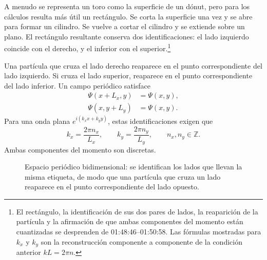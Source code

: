 A menudo se representa un toro como la superficie de un dónut, pero para los cálculos resulta más útil un rectángulo. Se corta la superficie una vez y se abre para formar un cilindro. Se vuelve a cortar el cilindro y se extiende sobre un plano. El rectángulo resultante conserva dos identificaciones: el lado izquierdo coincide con el derecho, y el inferior con el superior.\footnote{El rectángulo, la identificación de sus dos pares de lados, la reaparición de la partícula y la afirmación de que ambas componentes del momento están cuantizadas se desprenden de 01:48:46--01:50:58. Las fórmulas mostradas para \(k_x\) y \(k_y\) son la reconstrucción componente a componente de la condición anterior \(kL=2\pi n\).}

Una partícula que cruza el lado derecho reaparece en el punto correspondiente del lado izquierdo. Si cruza el lado superior, reaparece en el punto correspondiente del lado inferior. Un campo periódico satisface
\begin{align}
\Psi(x+L_x,y)&=\Psi(x,y),\\
\Psi(x,y+L_y)&=\Psi(x,y).
\end{align}
Para una onda plana \(e^{i(k_x x+k_y y)}\), estas identificaciones exigen que
\begin{equation}
k_x=\frac{2\pi n_x}{L_x},
\qquad
k_y=\frac{2\pi n_y}{L_y},
\qquad
n_x,n_y\in\mathbb Z.
\end{equation}
Ambas componentes del momento son discretas.

\begin{figure}[t]
\centering
{}
\caption{Espacio periódico bidimensional: se identifican los lados que llevan la misma etiqueta, de modo que una partícula que cruza un lado reaparece en el punto correspondiente del lado opuesto.}
\end{figure}

\begin{classroomqa}
\end{classroomqa}

